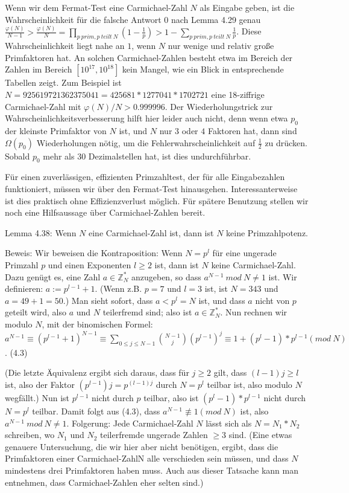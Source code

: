 \documentclass[a4paper]{article}
\begin{document}
\begin{multicols}{3}
        Wenn wir dem Fermat-Test eine Carmichael-Zahl $N$ als Eingabe geben, ist die Wahrscheinlichkeit für die falsche Antwort $0$ nach Lemma 4.29 genau $\frac{\varphi(N)}{N-1} > \frac{\varphi(N)}{N} = \prod_{p\ prim, p\ teilt\ N} (1 -\frac{1}{p})> 1 -\sum_{p\ prim, p\ teilt\ N} \frac{1}{p}$.
        Diese Wahrscheinlichkeit liegt nahe an $1$, wenn $N$ nur wenige und relativ große Primfaktoren hat. An solchen Carmichael-Zahlen besteht etwa im Bereich der Zahlen im Bereich $[10^{17} , 10^{18} ]$ kein Mangel, wie ein Blick in entsprechende Tabellen zeigt. Zum Beispiel ist $N=925619721362375041 = 425681* 1277041 *1702721$ eine 18-ziffrige Carmichael-Zahl mit $\varphi(N)/N > 0.999996$.
        Der Wiederholungstrick zur Wahrscheinlichkeitsverbesserung hilft hier leider auch nicht, denn wenn etwa $p_0$ der kleinste Primfaktor von $N$ ist, und $N$ nur $3$ oder $4$ Faktoren hat, dann sind $\Omega(p_0)$ Wiederholungen nötig, um die Fehlerwahrscheinlichkeit auf $\frac{1}{2}$ zu drücken. Sobald $p_0$ mehr als 30 Dezimalstellen hat, ist dies undurchführbar.

        Für einen zuverlässigen, effizienten Primzahltest, der für alle Eingabezahlen funktioniert, müssen wir über den Fermat-Test hinausgehen. Interessanterweise ist dies praktisch ohne Effizienzverlust möglich. Für spätere Benutzung stellen wir noch eine Hilfsaussage über Carmichael-Zahlen bereit.

        Lemma 4.38: Wenn $N$ eine Carmichael-Zahl ist, dann ist $N$ keine Primzahlpotenz.

        Beweis: Wir beweisen die Kontraposition: Wenn $N=p^l$ für eine ungerade Primzahl $p$ und einen Exponenten $l\geq 2$ ist, dann ist $N$ keine Carmichael-Zahl. Dazu genügt es, eine Zahl $a\in\mathbb{Z}^*_N$ anzugeben, so dass $a^{N-1}\ mod\ N\not= 1$ ist. Wir definieren: $a:=p^{l-1} + 1$. (Wenn z.B. $p=7$ und $l=3$ ist, ist $N=343$ und $a=49+1=50$.) Man sieht sofort, dass $a<p^l=N$ ist, und dass $a$ nicht von $p$ geteilt wird, also $a$ und $N$ teilerfremd sind; also ist $a\in\mathbb{Z}^*_N$. Nun rechnen wir modulo $N$, mit der binomischen Formel: $a^{N-1} \equiv (p^{l-1} + 1)^{N-1} \equiv \sum_{0 \leq j\leq N-1} \binom{N-1}{j} (p^{l-1})^j \equiv 1 + (p^l-1)*p^{l-1} (mod\ N)$. (4.3)

        (Die letzte Äquivalenz ergibt sich daraus, dass für $j\geq 2$ gilt, dass $(l-1)j\geq l$ ist, also der Faktor $(p^{l-1})j=p^{(l-1)j}$ durch $N=p^l$ teilbar ist, also modulo $N$ wegfällt.) Nun ist $p^{l-1}$ nicht durch $p$ teilbar, also ist $(p^l-1)*p^{l-1}$ nicht durch $N=p^l$ teilbar. Damit folgt aus (4.3), dass $a^{N-1}\not\equiv 1 (mod\ N)$ ist, also $a^{N-1}\ mod\ N\not= 1$.
        Folgerung: Jede Carmichael-Zahl $N$ lässt sich als $N=N_1 *N_2$ schreiben, wo $N_1$ und $N_2$ teilerfremde ungerade Zahlen $\geq 3$ sind.
        (Eine etwas genauere Untersuchung, die wir hier aber nicht benötigen, ergibt, dass die Primfaktoren einer Carmichael-ZahlN alle verschieden sein müssen, und dass $N$ mindestens drei Primfaktoren haben muss. Auch aus dieser Tatsache kann man entnehmen, dass Carmichael-Zahlen eher selten sind.)


\end{multicols}
\end{document}
